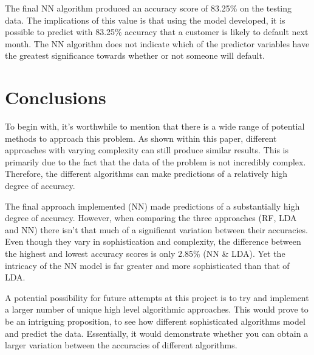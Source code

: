 \documentclass{article}
\begin{document}
The final NN algorithm produced an accuracy score of 83.25\% on the testing data. The implications of this value is that using the model developed, it is possible to predict with 83.25\% accuracy that a customer is likely to default next month. The NN algorithm does not indicate which of the predictor variables have the greatest significance towards whether or not someone will default. 


\section{Conclusions}
To begin with,  it's worthwhile to mention that there is a wide range of potential methods to approach this problem.  As shown within this paper, different approaches with varying complexity can still produce similar results. This is primarily due to the fact that the data of the problem is not incredibly complex. Therefore, the different algorithms can make predictions of a relatively high degree of accuracy. 

The final approach implemented (NN) made predictions of a substantially high degree of accuracy. However, when comparing the three approaches (RF, LDA and NN)  there isn't that much of a significant variation between their accuracies. Even though they vary in sophistication and complexity, the difference between the highest and lowest accuracy scores is only 2.85\% (NN \& LDA). Yet the intricacy of the NN model is far greater and more sophisticated than that of LDA. 

A potential possibility for future attempts at this project is to try and implement a larger number of unique high level algorithmic approaches. This would prove to be an intriguing proposition, to see how different sophisticated algorithms model and predict the data. Essentially, it would demonstrate whether you can obtain a larger variation between the accuracies of different algorithms. 


  
\end{document}
